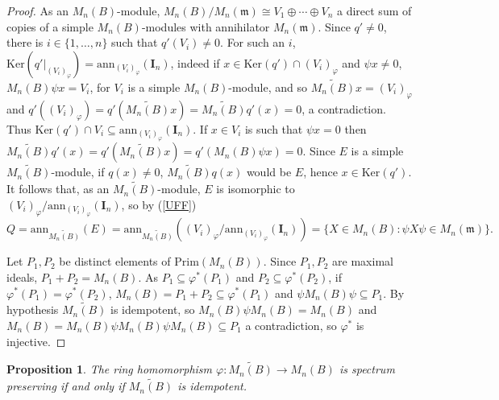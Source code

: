 \documentclass[oneside, a4paper, 11pt]{amsart}
\newtheorem{proposition}[theorem]{Proposition}
\newcommand{\Ker}[1]{\mathrm{Ker}(#1)}
\newcommand{\ann}{\mathrm{ann}}
\newcommand{\Prim}{\mathrm{Prim}}
\begin{document}
\begin{proof}
As an $M_n(B)$-module, $M_n(B)/M_n(\mathfrak{m})\cong V_1\oplus\cdots\oplus V_n$  a direct sum of copies of a simple $M_n(B)$-modules with annihilator $M_n(\mathfrak{m})$. Since $q'\neq 0$, there is $i\in\{1,\ldots, n\}$ such that $q'(V_i)\neq 0$. For such an $i$, $\Ker{q'|_{(V_i)_{\varphi}}}=\ann_{(V_i)_{\varphi}}(\mathbf{I}_n)$, indeed if $x\in \Ker{q'}\cap (V_i)_{\varphi}$ and $\psi x\neq 0$, $M_n(B)\psi x=V_i$, for $V_i$ is a simple $M_n(B)$-module, and so $\widetilde{M_n(B)} x=(V_i)_{\varphi}$ and $q'((V_i)_{\varphi}) = q'(\widetilde{M_n(B)} x)=\widetilde{M_n(B)} q'(x)=0$, a contradiction. Thus $\Ker{q'}\cap V_i \subseteq \ann_{(V_i)_{\varphi}}(\mathbf{I}_n)$. If $x\in V_i$ is such that $\psi x=0$ then $\widetilde{M_n(B)} q'(x)=q'(\widetilde{M_n(B)} x)=q'(M_n(B)\psi x)=0$. Since $E$ is a simple $\widetilde{M_n(B)}$-module, if $q(x)\neq 0$,  $\widetilde{M_n(B)} q(x)$ would be $E$, hence $x\in \Ker{q'}$. It follows that, as an $\widetilde{M_n(B)}$-module, $E$ is isomorphic to $(V_i)_{\varphi}/ \ann_{(V_i)_{\varphi}}(\mathbf{I}_n)$, so by (\ref{UFF})
$$Q=\ann_{\widetilde{M_n(B)}}(E)=\ann_{\widetilde{M_n(B)}}((V_i)_{\varphi}/ \ann_{(V_i)_{\varphi}}(\mathbf{I}_n))=\{X\in M_n(B): \psi X\psi \in M_n(\mathfrak{m})\}.$$

Let $P_1, P_2$ be distinct elements of $\Prim(M_n(B))$. Since $P_1, P_2$ are maximal ideals, $P_1+P_2=M_n(B)$. As $P_1\subseteq \varphi^*(P_1)$ and $P_2\subseteq \varphi^*(P_2)$, if $\varphi^*(P_1) = \varphi^*(P_2)$, $M_n(B)=P_1+P_2\subseteq \varphi^*(P_1)$ and $\psi M_n(B) \psi \subseteq P_1$. By hypothesis $\widetilde{M_n(B)}$ is idempotent, so $M_n(B)\psi M_n(B)=M_n(B)$  and 
$M_n(B)=M_n(B)\psi M_n(B)\psi M_n(B)\subseteq P_1$ a contradiction, so $\varphi^*$ is injective.
\end{proof}


\begin{proposition}\label{prop:weakly}
The ring homomorphism $\varphi:\widetilde{M_n(B)}\to M_n(B)$ is spectrum preserving if and only if $\widetilde{M_n(B)}$ is idempotent.
 \end{proposition}
\end{document}
